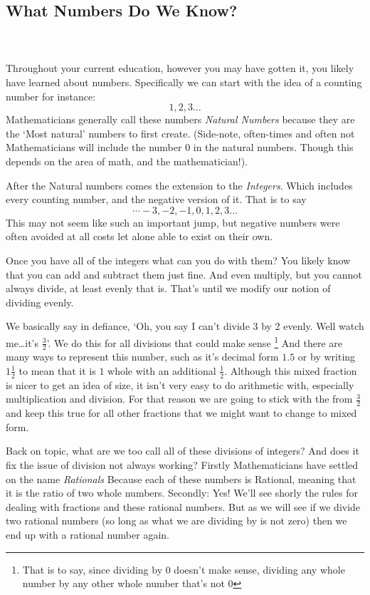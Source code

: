 \documentclass{amsart}
\numberwithin{equation}{section}
\theoremstyle{plain} %
\theoremstyle{definition}
\theoremstyle{remark}
\begin{document}
\subsection{What Numbers Do We Know?}%
\label{sub:What numbers do we know?}
\\~\\

Throughout your current education, however you may have gotten it, you likely have learned about numbers. Specifically we can start with the idea of a counting number for instance:
\[
	1,2,3 \dots
\]
Mathematicians generally call these numbers \emph{Natural Numbers} because they are the `Most natural' numbers to first create. (Side-note, often-times and often not Mathematicians will include the 
number $0$ in the natural numbers. Though this depends on the area of math, and the mathematician!).

After the Natural numbers comes the extension to the \emph{Integers}. Which includes every counting number,
and the negative version of it. That is to say
\[
	\cdots -3, -2, -1 ,0 ,1 ,2 ,3 \dots
\]
This may not seem like such an important jump, but negative numbers were often avoided at all costs let alone able to exist on their own.

Once you have all of the integers what can you do with them? You likely know that you can add and subtract them just fine. And even multiply, but you cannot always divide, at least evenly that is. That's until we
modify our notion of dividing evenly.

We basically say in defiance, `Oh, you say I can't divide 3 by 2 evenly. Well watch me\dots it's $\frac{3}{2} $'. We do this for all divisions that could make sense \footnote{
That is to say, since dividing by 0 doesn't make sense, dividing any whole number by any other whole number that's not 0}
And there are many ways to represent this number,
such as it's decimal form $1.5$ or by writing $1\frac{1}{2} $ to mean that it is $1$ whole with an additional $\frac{1}{2} $. Although this mixed fraction is nicer to get an idea of size, it isn't very easy
to do arithmetic with, especially multiplication and division. For that reason we are going to stick with the from $\frac{3}{2} $ and keep this true for all other fractions that we might want to change
to mixed form.

Back on topic, what are we too call all of these divisions of integers? And does it fix the issue of division not always working? Firstly Mathematicians have settled on the name \emph{Rationals}
Because each of these numbers is Rational, meaning that it is the ratio of two whole numbers. Secondly: Yes! We'll see shorly the rules for dealing with fractions and these rational numbers. But as we will see
if we divide two rational numbers (so long as what we are dividing by is not zero) then we end up with a rational number again.
\end{document}
